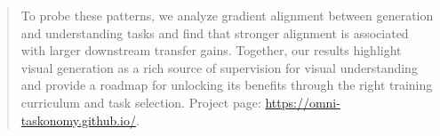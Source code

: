 \begin{abstract}
To probe these patterns, we analyze gradient alignment between generation and understanding tasks and find that stronger alignment is associated with larger downstream transfer gains.
Together, our results highlight visual generation as a rich source of supervision for visual understanding and provide a roadmap for unlocking its benefits through the right training curriculum and task selection. Project page: \url{https://omni-taskonomy.github.io/}.
\end{abstract}









